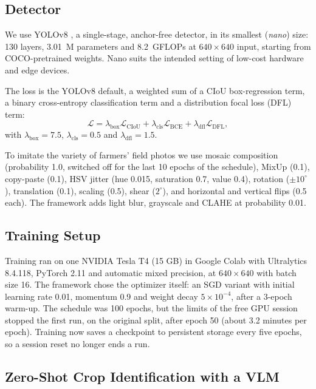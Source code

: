 \documentclass[conference]{IEEEtran}
\begin{document}
\subsection{Detector}

We use YOLOv8 \cite{yolov8}, a single-stage, anchor-free detector, in its smallest (\textit{nano}) size: 130 layers, 3.01~M parameters and 8.2~GFLOPs at $640\times640$ input, starting from COCO-pretrained weights. Nano suits the intended setting of low-cost hardware and edge devices.

The loss is the YOLOv8 default, a weighted sum of a CIoU box-regression term, a binary cross-entropy classification term and a distribution focal loss (DFL) term:
\begin{equation}
\mathcal{L} = \lambda_{\text{box}}\mathcal{L}_{\text{CIoU}} + \lambda_{\text{cls}}\mathcal{L}_{\text{BCE}} + \lambda_{\text{dfl}}\mathcal{L}_{\text{DFL}},
\end{equation}
with $\lambda_{\text{box}}=7.5$, $\lambda_{\text{cls}}=0.5$ and $\lambda_{\text{dfl}}=1.5$.

To imitate the variety of farmers' field photos we use mosaic composition (probability 1.0, switched off for the last 10 epochs of the schedule), MixUp (0.1), copy-paste (0.1), HSV jitter (hue 0.015, saturation 0.7, value 0.4), rotation ($\pm10^\circ$), translation (0.1), scaling (0.5), shear ($2^\circ$), and horizontal and vertical flips (0.5 each). The framework adds light blur, grayscale and CLAHE at probability 0.01.

\subsection{Training Setup}

Training ran on one NVIDIA Tesla T4 (15 GB) in Google Colab with Ultralytics 8.4.118, PyTorch 2.11 and automatic mixed precision, at $640\times640$ with batch size 16. The framework chose the optimizer itself: an SGD variant with initial learning rate 0.01, momentum 0.9 and weight decay $5\times10^{-4}$, after a 3-epoch warm-up. The schedule was 100 epochs, but the limits of the free GPU session stopped the first run, on the original split, after epoch 50 (about 3.2 minutes per epoch). Training now saves a checkpoint to persistent storage every five epochs, so a session reset no longer ends a run.

\subsection{Zero-Shot Crop Identification with a VLM}
\end{document}
